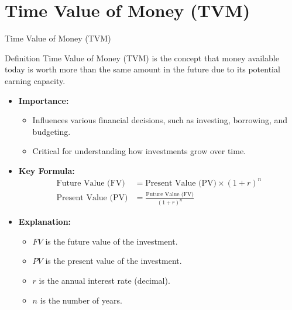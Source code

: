\documentclass{beamer}
\begin{document}
\section{Time Value of Money (TVM)}
\begin{frame}{Time Value of Money (TVM)}
    \begin{block}{Definition}
        Time Value of Money (TVM) is the concept that money available today is worth more than the same amount in the future due to its potential earning capacity.
    \end{block}
    \begin{itemize}
        \item \textbf{Importance:}
        \begin{itemize}
            \item Influences various financial decisions, such as investing, borrowing, and budgeting.
            \item Critical for understanding how investments grow over time.
        \end{itemize}
        \item \textbf{Key Formula:}
        \begin{align*}
            \text{Future Value (FV)} &= \text{Present Value (PV)} \times (1 + r)^n \\
            \text{Present Value (PV)} &= \frac{\text{Future Value (FV)}}{(1 + r)^n}
        \end{align*}
        \item \textbf{Explanation:}
        \begin{itemize}
            \item $FV$ is the future value of the investment.
            \item $PV$ is the present value of the investment.
            \item $r$ is the annual interest rate (decimal).
            \item $n$ is the number of years.
        \end{itemize}
    \end{itemize}
\end{frame}
\end{document}
